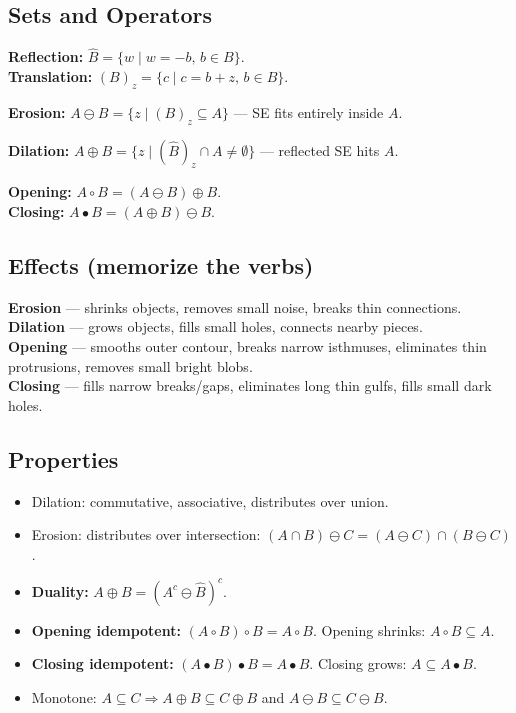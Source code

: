 \documentclass[10pt]{article}
\begin{document}
\subsection{Sets and Operators}
\begin{tcolorbox}[studybox]
\textbf{Reflection:} $\hat{B} = \{w \mid w = -b,\, b \in B\}$.\\
\textbf{Translation:} $(B)_z = \{c \mid c = b+z,\, b \in B\}$.
\smallskip

\textbf{Erosion:}
\(A \ominus B = \{z \mid (B)_z \subseteq A\}\) — SE fits entirely inside $A$.
\smallskip

\textbf{Dilation:}
\(A \oplus B = \{z \mid (\hat{B})_z \cap A \ne \emptyset\}\) — reflected SE hits $A$.
\smallskip

\textbf{Opening:} \(A \circ B = (A \ominus B) \oplus B\).\\
\textbf{Closing:} \(A \bullet B = (A \oplus B) \ominus B\).
\end{tcolorbox}

\subsection{Effects (memorize the verbs)}
\begin{tcolorbox}[studybox]
\textbf{Erosion} — shrinks objects, removes small noise, breaks thin connections.\\
\textbf{Dilation} — grows objects, fills small holes, connects nearby pieces.\\
\textbf{Opening} — smooths outer contour, breaks narrow isthmuses, eliminates thin protrusions, removes small bright blobs.\\
\textbf{Closing} — fills narrow breaks/gaps, eliminates long thin gulfs, fills small dark holes.
\end{tcolorbox}

\subsection{Properties}
\begin{itemize}
  \item Dilation: commutative, associative, distributes over union.
  \item Erosion: distributes over intersection: $(A\cap B)\ominus C = (A\ominus C)\cap (B\ominus C)$.
  \item \textbf{Duality:} \(A \oplus B = (A^c \ominus \hat{B})^c\).
  \item \textbf{Opening idempotent:} $(A\circ B)\circ B = A\circ B$. Opening shrinks: $A\circ B \subseteq A$.
  \item \textbf{Closing idempotent:} $(A\bullet B)\bullet B = A\bullet B$. Closing grows: $A \subseteq A\bullet B$.
  \item Monotone: $A \subseteq C \Rightarrow A\oplus B \subseteq C\oplus B$ and $A\ominus B \subseteq C\ominus B$.
\end{itemize}
\end{document}
